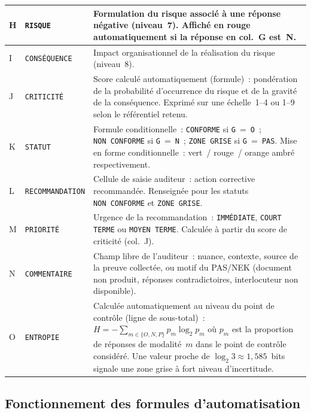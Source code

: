 \begin{longtable}{|p{1.2cm}|p{3cm}|p{11cm}|}
H & \texttt{RISQUE} &
  Formulation du risque associé à une réponse négative (niveau~7).
  Affiché en rouge automatiquement si la réponse en col.~G est~N. \\ \hline

I & \texttt{CONSÉQUENCE} &
  Impact organisationnel de la réalisation du risque (niveau~8). \\ \hline

J & \texttt{CRITICITÉ} &
  Score calculé automatiquement (formule)~: pondération de la
  probabilité d'occurrence du risque et de la gravité de la conséquence.
  Exprimé sur une échelle~1--4 ou 1--9 selon le référentiel retenu. \\ \hline

K & \texttt{STATUT} &
  Formule conditionnelle~: \texttt{CONFORME} si \texttt{G}~=~\texttt{O}~;
  \texttt{NON~CONFORME} si \texttt{G}~=~\texttt{N}~;
  \texttt{ZONE~GRISE} si \texttt{G}~=~\texttt{PAS}.
  Mise en forme conditionnelle~: vert~/ rouge~/ orange ambré
  respectivement. \\ \hline

L & \texttt{RECOMMANDATION} &
  Cellule de saisie auditeur~: action corrective recommandée. Renseignée
  pour les statuts \texttt{NON~CONFORME} et \texttt{ZONE~GRISE}. \\ \hline

M & \texttt{PRIORITÉ} &
  Urgence de la recommandation~: \texttt{IMMÉDIATE}, \texttt{COURT TERME}
  ou \texttt{MOYEN TERME}. Calculée à partir du score de criticité
  (col.~J). \\ \hline

N & \texttt{COMMENTAIRE} &
  Champ libre de l'auditeur~: nuance, contexte, source de la preuve
  collectée, ou motif du PAS/NEK (document non produit, réponses
  contradictoires, interlocuteur non disponible). \\ \hline

O & \texttt{ENTROPIE} &
  Calculée automatiquement au niveau du point de contrôle (ligne de
  sous-total)~: $H = -\sum_{m \in \{O,N,P\}} p_m \log_2 p_m$ où $p_m$
  est la proportion de réponses de modalité~$m$ dans le point de contrôle
  considéré. Une valeur proche de $\log_2 3 \approx 1{,}585$~bits signale
  une zone grise à fort niveau d'incertitude. \\ \hline

\end{longtable}

\subsection{Fonctionnement des formules d'automatisation}

